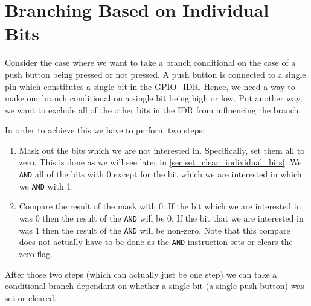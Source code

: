 \section{Branching Based on Individual Bits}

Consider the case where we want to take a branch conditional on the case of a push button being pressed or not pressed. A push button is connected to a single pin which constitutes a single bit in the GPIO\_IDR. Hence, we need a way to make our branch conditional on a single bit being high or low. Put another way, we want to exclude all of the other bits in the IDR from influencing the branch. 

In order to achieve this we have to perform two steps:
\begin{enumerate}
\item Mask out the bits which we are not interested in. Specifically, set them all to zero. This is done as we will see later in \autoref{sec:set_clear_individual_bits}. We \texttt{AND} all of the bits with 0 except for the bit which we are interested in which we \texttt{AND} with 1.
\item Compare the result of the mask with 0. If the bit which we are interested in was 0 then the result of the \texttt{AND} will be 0. If the bit that we are interested in was 1 then the result of the \texttt{AND} will be non-zero. Note that this compare does not actually have to be done as the \texttt{AND} instruction sets or clears the zero flag.
\end{enumerate}
After those two steps (which can actually just be one step) we can take a conditional branch dependant on whether a single bit (a single push button) was set or cleared. 
